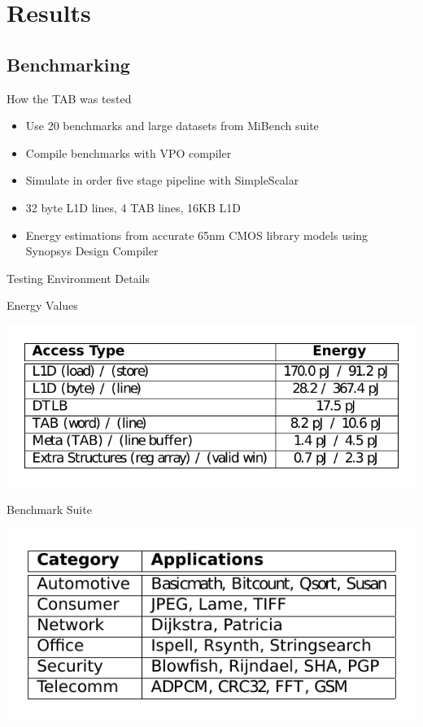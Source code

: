 \documentclass{beamer}
\begin{document}
\section{Results}
\subsection{Benchmarking}
\begin{frame}{How the TAB was tested}
   \begin{itemize}
      \item Use 20 benchmarks and large datasets from MiBench suite
      \item Compile benchmarks with VPO compiler
      \item Simulate in order five stage pipeline with SimpleScalar
      \item 32 byte L1D lines, 4 TAB lines, 16KB L1D
      \item Energy estimations from accurate 65nm CMOS library models
         using Synopsys Design Compiler
   \end{itemize}
\end{frame}
\begin{frame}{Testing Environment Details}
   \begin{block}{Energy Values}
      \begin{center}
         \vspace{-0.3cm}
         \includegraphics[scale=0.7]{figures/benchmarkenergy.pdf}
         \vspace{-0.3cm}
      \end{center}
   \end{block}
   \begin{block}{Benchmark Suite}
      \begin{center}
         \vspace{-0.3cm}
         \includegraphics[scale=0.7]{figures/benchmarksuite.pdf}
         \vspace{-0.3cm}
      \end{center}
   \end{block}
\end{frame}
\end{document}

